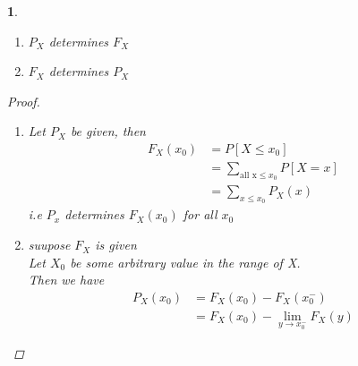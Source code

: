 \documentclass[11pt]{article}
\newtheorem{theorem}{\framebox{Thm}}[section]
\newcommand\tab[1][1cm]{\hspace*{#1}}
\begin{document}
            \begin{theorem} \tab 
                \begin{enumerate}
                    \item $P_X$ determines $F_X$ 
                    \item $F_X$ determines $P_X$
                \end{enumerate}
                \begin{proof}
                    \begin{enumerate}
                        \item Let $P_X$ be given, then 
                                \begin{align*}
                                    F_X(x_0)    &= P[X \leq x_0]  \\
                                                &= \sum_{\text{all x} \leq x_0 } P[X = x]  \tag{Ax 3} \\
                                                &= \sum_{x \leq x_0} P_X(x) 
                                \end{align*}
                                i.e $P_x$ determines $F_X(x_0)$ for all $x_0$
                        \item suupose $F_X$ is given \\
                                Let $X_0$ be some arbitrary value in the range of X.\\
                                Then we have 
                                \begin{align*}
                                    P_X(x_0)    &= F_X(x_0) - F_X(x_0^-)  \\
                                                &= F_X(x_0) - \lim_{y \rightarrow x_0^-} F_X(y)
                                \end{align*}
                    \end{enumerate} 
                \end{proof}
            \end{theorem}
            \newpage
\end{document}
